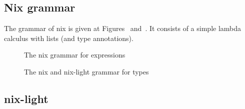 \subsection{Nix grammar}
\label{sec:nix-grammar}

The grammar of nix is given at Figures~
and~. It consists of a simple lambda calculus with lists (and type annotations).

\begin{figure}
  
  \caption{\label{grammar::nix}The nix grammar for expressions}
\end{figure}

\begin{figure}
  
  \caption{\label{grammar::types}The nix and nix-light grammar for types}
\end{figure}

\subsection{nix-light}
\label{sec:nix-light-grammar}

